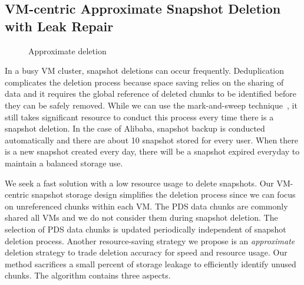%





\subsection{ VM-centric Approximate Snapshot Deletion with Leak Repair}

\begin{figure}[htbp]
  \centering
  \caption{Approximate deletion}
  \label{fig:deletion_flow}
\end{figure}

In a busy VM cluster, snapshot deletions can occur frequently.
Deduplication complicates the deletion process because space saving relies on the sharing of data
and it requires the global reference of deleted chunks to be identified before  they can be safely removed.
While we can use the mark-and-sweep technique~\cite{Guo2011}, 
it still takes significant resource to conduct this process every time there is a snapshot deletion.
In the case of Alibaba, snapshot backup is conducted automatically and there are 
about 10 snapshot stored for every user. When there is
a new snapshot created every day,  there will be  a snapshot expired everyday to maintain
a balanced storage use. 

We seek a fast solution with a low resource usage to delete snapshots.
Our VM-centric snapshot storage design simplifies the deletion process since 
we can focus on  unreferenced chunks within each VM.
The PDS data chunks are commonly shared all VMs and we do not consider them
during snapshot deletion.  The selection of PDS data chunks is updated periodically independent of snapshot deletion process.
Another resource-saving strategy we propose is
an {\em approximate} deletion strategy to trade deletion accuracy for
speed and resource usage. Our method sacrifices a small percent of storage leakage
to efficiently identify unused chunks.
The algorithm contains three aspects.


